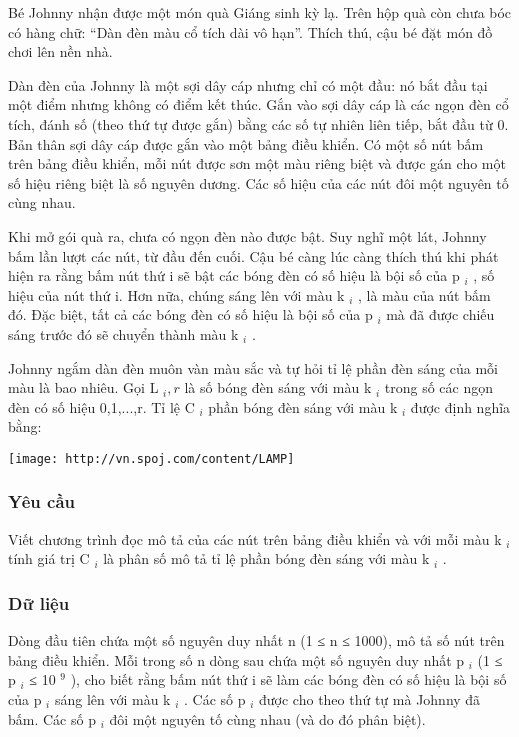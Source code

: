 



   Bé Johnny nhận được một món quà Giáng sinh kỳ lạ. Trên hộp quà còn chưa bóc có hàng chữ: “Dàn đèn màu cổ tích dài vô hạn”. Thích thú, cậu bé đặt món đồ chơi lên nền nhà.  

   Dàn đèn của Johnny là một sợi dây cáp nhưng chỉ có một đầu: nó bắt đầu tại một điểm nhưng không có điểm kết thúc. Gắn vào sợi dây cáp là các ngọn đèn cổ tích, đánh số (theo thứ tự được gắn) bằng các số tự nhiên liên tiếp, bắt đầu từ 0. Bản thân sợi dây cáp được gắn vào một bảng điều khiển. Có một số nút bấm trên bảng điều khiển, mỗi nút được sơn một màu riêng biệt và được gán cho một số hiệu  riêng biệt là số nguyên dương. Các số hiệu của các nút đôi một nguyên tố cùng nhau.  

   Khi mở gói quà ra, chưa có ngọn đèn nào được bật. Suy nghĩ một lát, Johnny bấm lần lượt các nút, từ đầu đến cuối. Cậu bé càng lúc càng thích thú khi phát hiện ra rằng bấm nút thứ i sẽ bật các bóng đèn có số hiệu là bội số của p   $_    i   $   , số hiệu của nút thứ i. Hơn nữa, chúng sáng lên với màu k   $_    i   $   , là màu của nút bấm đó. Đặc biệt, tất cả các bóng đèn có số hiệu là bội số của p   $_    i   $   mà đã được chiếu sáng trước đó sẽ chuyển thành màu k   $_    i   $   .  

   Johnny ngắm dàn đèn muôn vàn màu sắc và tự hỏi tỉ lệ phần đèn sáng của mỗi màu là bao nhiêu. Gọi L   $_    i,r   $   là số bóng đèn sáng với màu k   $_    i   $   trong số các ngọn đèn có số hiệu 0,1,...,r. Tỉ lệ C   $_    i   $   phần bóng đèn sáng với màu k   $_    i   $   được định nghĩa bằng:  


\texttt{[image: http://vn.spoj.com/content/LAMP]}

\subsubsection{   Yêu cầu  }

   Viết chương trình đọc mô tả của các nút trên bảng điều khiển và với mỗi màu k   $_    i   $   tính giá trị C   $_    i   $   là phân số mô tả tỉ lệ phần bóng đèn sáng với màu k   $_    i   $   .  

\subsubsection{   Dữ liệu  }

   Dòng đầu tiên chứa một số nguyên duy nhất n (1 ≤ n ≤ 1000), mô tả số nút trên bảng điều khiển. Mỗi trong số n dòng sau chứa một số nguyên duy nhất p   $_    i   $   (1 ≤ p   $_    i   $   ≤ 10   $^    9   $   ), cho biết rằng bấm nút thứ i sẽ làm các bóng đèn có số hiệu là bội số của p   $_    i   $   sáng lên với màu k   $_    i   $   . Các số p   $_    i   $   được cho theo thứ tự mà Johnny đã bấm. Các số p   $_    i   $   đôi một nguyên tố cùng nhau (và do đó phân biệt).  

